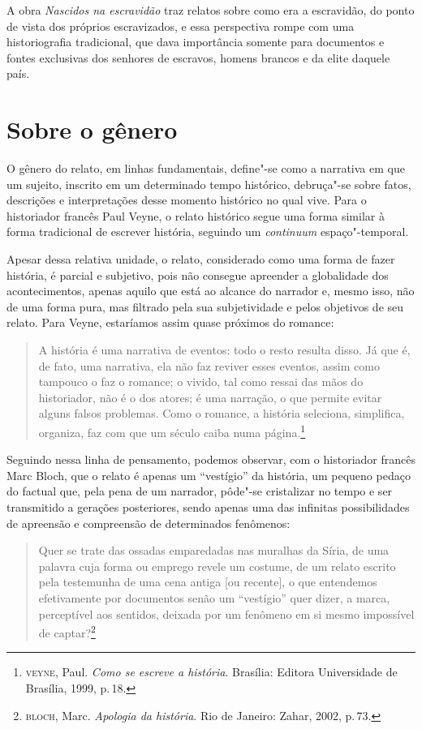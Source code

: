 A obra \emph{Nascidos na escravidão} traz relatos sobre como era a
escravidão, do ponto de vista dos próprios escravizados, e essa
perspectiva rompe com uma historiografia tradicional, que dava
importância somente para documentos e fontes exclusivas dos senhores de
escravos, homens brancos e da elite daquele país.

\section{Sobre o gênero}

O gênero do relato, em linhas fundamentais, define"-se como a narrativa em que um sujeito, inscrito em um determinado tempo histórico, debruça"-se sobre fatos, descrições e interpretações desse momento histórico no qual vive. Para o historiador francês Paul Veyne, o relato histórico segue uma forma similar à forma tradicional de escrever história, seguindo um \textit{continuum} espaço"-temporal.

Apesar dessa relativa unidade, o relato, considerado como uma forma de fazer história,
é parcial e subjetivo, pois não consegue apreender a globalidade dos acontecimentos, apenas
aquilo que está ao alcance do narrador e, mesmo isso, não de uma forma pura, mas filtrado pela sua subjetividade e pelos objetivos de seu relato.
Para Veyne, estaríamos assim quase próximos do romance:

\begin{quote}
A história é uma narrativa de eventos: todo o resto resulta disso. Já que é, de fato, uma narrativa, ela não faz reviver esses eventos, assim como tampouco o faz o romance; o vivido, tal como ressai das mãos do historiador, não é o dos atores; é uma narração,
o que permite evitar alguns falsos problemas. Como o romance, a
história seleciona, simplifica, organiza, faz com que um século
caiba numa página.\footnote{\textsc{veyne}, Paul. \textit{Como se escreve a história}. Brasília: Editora Universidade de Brasília, 1999, p.\,18.}
\end{quote}

Seguindo nessa linha de pensamento, podemos observar, com o historiador francês Marc Bloch, que o relato é apenas um ``vestígio'' da história, um pequeno pedaço do factual que, pela pena de um narrador, pôde"-se cristalizar no tempo e ser transmitido a gerações posteriores, sendo apenas uma das infinitas possibilidades de apreensão e compreensão de determinados fenômenos:

\begin{quote}
Quer se trate das ossadas
emparedadas nas muralhas da Síria, de uma palavra cuja forma ou emprego revele um
costume, de um relato escrito pela testemunha de uma cena antiga [ou recente], o que
entendemos efetivamente por documentos senão um ``vestígio'' quer dizer, a marca,
perceptível aos sentidos, deixada por um fenômeno em si mesmo impossível de captar?\footnote{\textsc{bloch}, Marc. \textit{Apologia da história}. Rio de Janeiro: Zahar, 2002, p.\,73.}
\end{quote}

